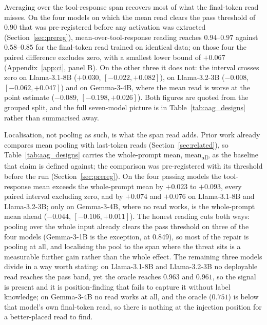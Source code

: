 

Averaging over the tool-response span recovers most of what the final-token read misses. On the four models on which
the mean read clears the pass threshold of $0.90$ that was pre-registered before any activation was extracted
(Section~\ref{sec:prereg}), mean-over-tool-response reading reaches $0.94$--$0.97$ against $0.58$--$0.85$ for the final-token
read trained on identical data; on those four the paired difference excludes zero, with a smallest lower bound of
$+0.067$ (Appendix~\ref{app:ci}, panel B). On the other three it does not: the interval crosses zero on Llama-3.1-8B
($+0.030$, $[-0.022, +0.082]$), on Llama-3.2-3B ($-0.008$, $[-0.062, +0.047]$) and on Gemma-3-4B, where the mean read
is worse at the point estimate ($-0.089$, $[-0.198, +0.026]$). Both figures are quoted from the grouped split, and the
full seven-model picture is in Table~\ref{tab:aag_designs} rather than summarised away.

Localisation, not pooling as such, is what the span read adds. Prior work already compares mean pooling with
last-token reads (Section~\ref{sec:related}), so Table~\ref{tab:aag_designs} carries the whole-prompt mean,
mean\textsubscript{all}, as the baseline that claim is defined against; the comparison was pre-registered with its
threshold before the run (Section~\ref{sec:prereg}). On the four passing models the tool-response mean exceeds the
whole-prompt mean by $+0.023$ to $+0.093$, every paired interval excluding zero, and by $+0.074$ and $+0.076$ on
Llama-3.1-8B and Llama-3.2-3B; only on Gemma-3-4B, where no read works, is the whole-prompt mean ahead ($-0.044$,
$[-0.106, +0.011]$). The honest reading cuts both ways: pooling over the whole input already clears the pass threshold
on three of the four models (Gemma-3-1B is the exception, at $0.849$), so most of the repair is pooling at all, and
localising the pool to the span where the threat sits is a measurable further gain rather than the whole effect. The remaining three models divide in a way worth stating: on
Llama-3.1-8B and Llama-3.2-3B no deployable read reaches the pass band, yet the oracle reaches $0.963$ and $0.961$, so
the signal is present and it is position-finding that fails to capture it without label knowledge; on Gemma-3-4B no
read works at all, and the oracle ($0.751$) is below that model's own final-token read, so there is nothing at the
injection position for a better-placed read to find.

